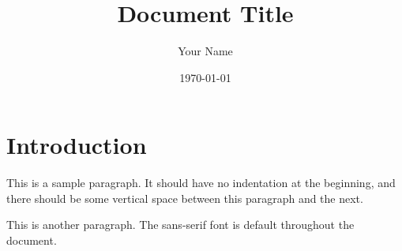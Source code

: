 \documentclass[11pt,a4paper]{article}
\title{Document Title}
\author{Your Name}
\date{\today}
\begin{document}
\maketitle

\section{Introduction}

This is a sample paragraph. It should have no indentation at the beginning,
and there should be some vertical space between this paragraph and the next.

This is another paragraph. The sans-serif font is default throughout the document.


\printbibliography
\end{document}
